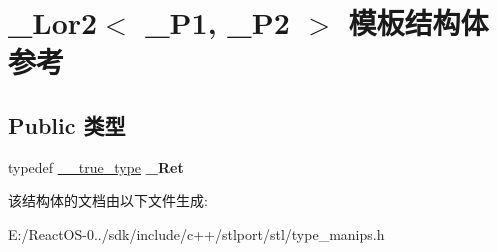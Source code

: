 \hypertarget{struct___lor2}{}\section{\+\_\+\+Lor2$<$ \+\_\+\+P1, \+\_\+\+P2 $>$ 模板结构体 参考}
\label{struct___lor2}
\subsection*{Public 类型}
\begin{DoxyCompactItemize}
\item 
\mbox{\label{struct___lor2_aac075339849b759dc48c6e2ef9ed8c67}} 
typedef \hyperlink{struct____true__type}{\+\_\+\+\_\+true\+\_\+type} {\bfseries \+\_\+\+Ret}
\end{DoxyCompactItemize}


该结构体的文档由以下文件生成\+:\begin{DoxyCompactItemize}
\item 
E\+:/\+React\+O\+S-\/0../sdk/include/c++/stlport/stl/type\+\_\+manips.\+h\end{DoxyCompactItemize}

